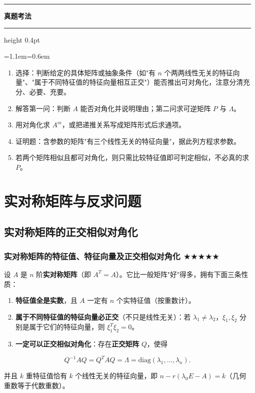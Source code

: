 \documentclass[11pt,openany,UTF8]{ctexbook}
\newcommand{\callouthead}[2]{%
  \par\addvspace{7pt}\noindent
  {\color{#1}\rule[-0.15em]{3pt}{1.05em}}\hspace{0.5em}%
  {\bfseries\color{#1}#2}\par\nobreak\vspace{-0.35em}%
  {\color{rulesep}\hrule height 0.4pt}\nobreak\vspace{0.45em}%
  \begingroup\small\setlength{\parindent}{0pt}%
  \leftskip=1.1em\rightskip=0.6em\noindent\ignorespaces}
\newcommand{\calloutend}{\par\endgroup\addvspace{7pt}}
\newenvironment{callexam}[1]{\callouthead{exambar}{#1}}{\calloutend}
\begin{document}
\begin{callexam}{真题考法}
\begin{enumerate}
\item 选择：判断给定的具体矩阵或抽象条件（如"有 $n$ 个两两线性无关的特征向量"、"属于不同特征值的特征向量相互正交"）能否推出可对角化，注意分清充分、必要、充要。
\item 解答第一问：判断 $A$ 能否对角化并说明理由；第二问求可逆矩阵 $P$ 与 $\Lambda$。
\item 用对角化求 $A^m$，或把递推关系写成矩阵形式后求通项。
\item 证明题：含参数的矩阵"有三个线性无关的特征向量"，据此列方程求参数。
\item 若两个矩阵相似且都可对角化，则只需比较特征值即可判定相似，不必真的求 $P$。
\end{enumerate}
\end{callexam}

\section{实对称矩阵与反求问题}

\subsection{实对称矩阵的正交相似对角化}

\subsubsection{实对称矩阵的特征值、特征向量及正交相似对角化 $\bigstar$$\bigstar$$\bigstar$$\bigstar$$\bigstar$}

设 $A$ 是 $n$ 阶\textbf{实对称矩阵}（即 $A^T=A$）。它比一般矩阵"好"得多，拥有下面三条性质：

\begin{enumerate}
\item \textbf{特征值全是实数}，且 $A$ 一定有 $n$ 个实特征值（按重数计）。
\item \textbf{属于不同特征值的特征向量必正交}（不只是线性无关）：若 $\lambda_1\neq\lambda_2$，$\xi_1,\xi_2$ 分别是属于它们的特征向量，则 $\xi_1^T\xi_2=0$。
\item \textbf{一定可以正交相似对角化}：存在\textbf{正交矩阵} $Q$，使得
\end{enumerate}
\[Q^{-1}AQ=Q^TAQ=\Lambda=\mathrm{diag}(\lambda_1,\dots,\lambda_n).\]

并且 $k$ 重特征值恰有 $k$ 个线性无关的特征向量，即 $n-r(\lambda_0E-A)=k$（几何重数等于代数重数）。
\end{document}
